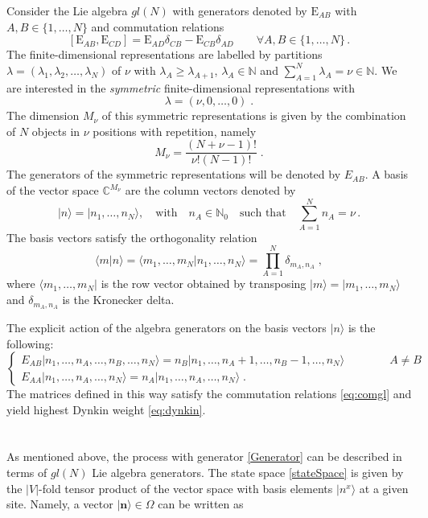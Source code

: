 \documentclass[10pt]{article}
\numberwithin{equation}{section}
\numberwithin{equation}{subsection}
\newcommand{\co}{\;,}
\newcommand{\dt}{\;.}
\newcommand{\EE}{\mathrm{E}}
\newcommand{\twoj}{\nu}
\begin{document}
Consider the Lie algebra ${gl}(N)$ with generators denoted by $\EE_{AB}$ with $A,B\in \{1,\ldots,N\}$ and commutation relations
\begin{equation}\label{eq:comgl}
\left[\EE_{AB},\EE_{CD}\right]=\EE_{AD}\delta_{CB}-\EE_{CB}\delta_{AD}\qquad \forall A,B\in \{1,\ldots,N\}\,.
\end{equation}
The finite-dimensional representations are labelled by partitions $\lambda=(\lambda_1,\lambda_2,\ldots,\lambda_N)$ of $\nu$ with  $\lambda_A\geq \lambda_{A+1}$,  $\lambda_A\in \mathbb{N}$ and $\sum_{A=1}^N \lambda_A = \nu\in\mathbb{N}$.  
We are interested in the {\em symmetric} finite-dimensional representations with 
\begin{equation}\label{eq:dynkin}
    \lambda=(\twoj,0,\ldots,0) \;.
\end{equation} 
The dimension $M_\twoj$ of this symmetric representations is given by the combination of $N$ objects in $\twoj$ positions with repetition, namely
\begin{equation}
	M_\twoj= \frac{(N+\twoj-1)!}{\twoj  !(N-1)!}\dt
\end{equation} 
The generators of the symmetric representations will be denoted by $E_{AB}$.
A basis of the vector space $\mathbb{C}^{M_\twoj}$ are the column vectors denoted by
\begin{equation}
  |n\rangle=  |n_{1},\ldots,n_{N}\rangle,\quad \text{with}\quad n_{A}\in\mathbb{N}_{0}\quad \text{such that}\quad \sum_{A=1}^{N}n_{A}=\nu\,.
\end{equation}
The basis vectors satisfy the orthogonality relation
\begin{equation}\label{ortho}
   \langle m|n \rangle =\langle m_{1},\ldots,m_{N}|n_{1},\ldots,n_{N}\rangle=\prod_{A=1}^{N}\delta_{m_{A},n_{A}}\co
\end{equation}
where  $ \langle m_{1},\ldots,m_{N}|$ is the row vector obtained by transposing $|m\rangle=|m_{1},\ldots,m_{N}\rangle$ and $\delta_{m_{A},n_{A}}$ is the Kronecker delta. 

The explicit action of the algebra generators on the basis  vectors $|n\rangle$ is the following:
\begin{equation}\label{actionE}
	\begin{cases}
		E_{AB}|n_{1},\ldots,n_{A},\ldots,n_{B},\ldots,n_{N}\rangle =n_{B}|n_{1},\ldots,n_{A}+1,\ldots,n_{B}-1,\ldots,n_{N}\rangle\qquad\qquad A\neq B\\[0.1cm]
		E_{AA}|n_{1},\ldots,n_{A},\ldots,n_{N}\rangle = n_{A} |n_{1},\ldots,n_{A},\ldots,n_{N}\rangle\dt
	\end{cases}
\end{equation}  
The matrices defined in this way satisfy the commutation relations \eqref{eq:comgl} and yield highest Dynkin weight \eqref{eq:dynkin}. \\
\\ \\
As mentioned above, the process with generator \eqref{Generator} can be described in terms of ${gl}(N)$ Lie algebra generators. The state space \eqref{stateSpace} is given by the $|V|$-fold tensor product of the vector space with basis elements $|n^x\rangle$ at a given site. Namely,
a vector $|{\bm{n}}\rangle \in \Omega$ can be written as
\end{document}
